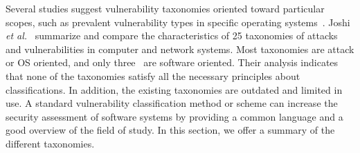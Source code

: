 




Several studies suggest vulnerability taxonomies oriented toward particular scopes, such as prevalent vulnerability types in specific operating systems~\cite{Tate2020CharacterizingVI}. Joshi \textit{et al.}~\cite{Joshi2015ARO} summarize and compare the characteristics of 25 taxonomies of attacks and vulnerabilities in computer and network systems. Most taxonomies are attack or OS oriented, and only three~\cite{Bazaz2007TowardsAT, Piessens2002ATO, Weber2005ASF} are software oriented. Their analysis indicates that none of the taxonomies satisfy all the necessary principles about classifications. In addition, the existing taxonomies are outdated and limited in use. A standard vulnerability classification method or scheme can increase the security assessment of software systems by providing a common language and a good overview of the field of study. In this section, we offer a summary of the different taxonomies. 

